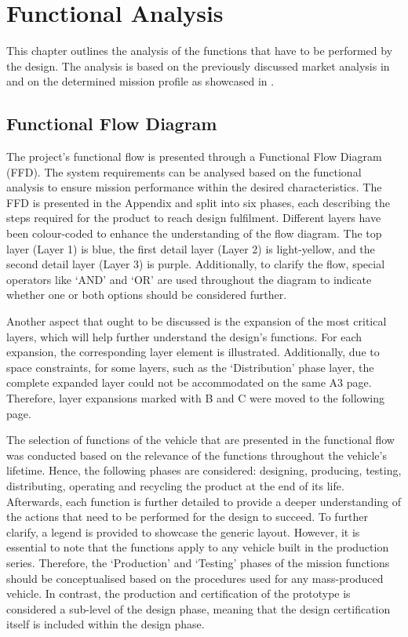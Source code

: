\chapter{Functional Analysis}
\label{ch:Functional_Analysis}
This chapter outlines the analysis of the functions that have to be performed by the design.
The analysis is based on the previously discussed market analysis in  and on the determined mission profile as showcased in .

\section{Functional Flow Diagram}\label{sec:FFD}
The project's functional flow is presented through a Functional Flow Diagram (FFD). The system requirements can be analysed based on the functional analysis to ensure mission performance within the desired characteristics.
The FFD is presented in the Appendix and split into six phases, each describing the steps required for the product to reach design fulfilment.
Different layers have been colour-coded to enhance the understanding of the flow diagram.
The top layer (Layer 1) is blue, the first detail layer (Layer 2) is light-yellow, and the second detail layer (Layer 3) is purple.
Additionally, to clarify the flow, special operators like \enquote*{AND} and \enquote*{OR} are used throughout the diagram to indicate whether one or both options should be considered further.

Another aspect that ought to be discussed is the expansion of the most critical layers, which will help further understand the design's functions.
For each expansion, the corresponding layer element is illustrated.
Additionally, due to space constraints, for some layers, such as the \enquote*{Distribution} phase layer, the complete expanded layer could not be accommodated on the same A3 page.
Therefore, layer expansions marked with B and C were moved to the following page.

The selection of functions of the vehicle that are presented in the functional flow was conducted based on the relevance of the functions throughout the vehicle’s lifetime.
Hence, the following phases are considered: designing, producing, testing, distributing, operating and recycling the product at the end of its life.
Afterwards, each function is further detailed to provide a deeper understanding of the actions that need to be performed for the design to succeed.
To further clarify, a legend is provided to showcase the generic layout.
However, it is essential to note that the functions apply to any vehicle built in the production series.
Therefore, the \enquote*{Production} and \enquote*{Testing} phases of the mission functions should be conceptualised based on the procedures used for any mass-produced vehicle.
In contrast, the production and certification of the prototype is considered a sub-level of the design phase, meaning that the design certification itself is included within the design phase.

